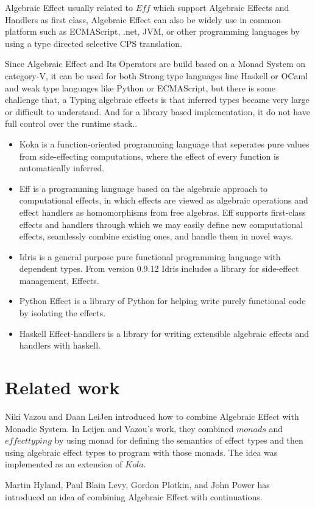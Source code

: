 \documentclass{article}
\begin{document}
Algebraic Effect usually related to $Eff$ which support Algebraic Effects and Handlers as first class,    Algebraic Effect can also be widely use in common platform such as ECMAScript, .net, JVM, or other programming languages by using a type directed selective CPS translation\cite{algebraic-effects-for-functional-programming}.

Since Algebraic Effect and Its Operators are build based on a Monad System on category-V, it can be used for both Strong type languages line Haskell or OCaml and weak type languages like Python or ECMAScript, but there is some challenge that, a Typing algebraic effects is that inferred types became very large or difficult to understand. And for a library based implementation, it do not have full control over the runtime stack.\cite{algebraic-effects-for-functional-programming}.

\begin{itemize}
\item Koka is a function-oriented programming language that seperates pure values from side-effecting computations, where the effect of every function is automatically inferred.

\item Eff is a programming language based on the algebraic approach to computational effects, in which effects are viewed as algebraic operations and effect handlers as homomorphisms from free algebras.\cite{eff} Eff supports ﬁrst-class effects and handlers through which we may easily deﬁne new computational effects, seamlessly combine existing ones, and handle them in novel ways.

\item Idris is a general purpose pure functional programming language with dependent types. From version 0.9.12 Idris includes a library for side-effect management, Effects.


\item Python Effect is a library of Python for helping write purely functional code by isolating the effects\cite{python-effect}.

\item Haskell Effect-handlers is a library for writing extensible algebraic effects and handlers with haskell\cite{effect-handlers}.
\end{itemize}

\section{Related work}

Niki Vazou and Daan LeiJen introduced how to combine Algebraic Effect with Monadic  System\cite{10.1007/978-3-319-28228-2_11}. In Leijen and Vazou's work, they combined $monads$ and $effect typing$ by using monad for defining the semantics of effect types and then using algebraic effect types to program with those monads. The idea was implemented as an extension of $Kola$.

Martin Hyland, Paul Blain Levy, Gordon Plotkin, and John Power has introduced an idea of combining Algebraic Effect with continuations\cite{HYLAND200720}.

{}
\end{document}
